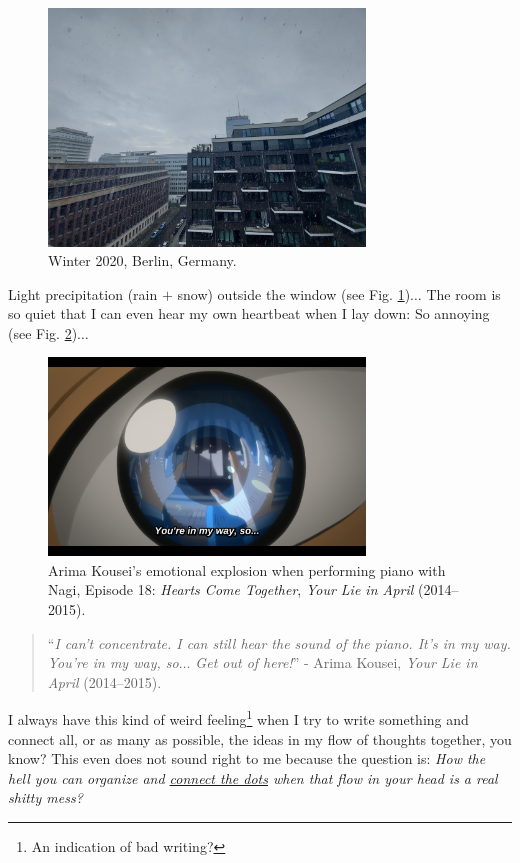 \documentclass[12pt]{article}
\begin{document}
\begin{figure}[H]
	\centering
	\includegraphics[width=0.75\textwidth]{Berlin_winter2020}
	\caption{Winter 2020, Berlin, Germany.}
	\label{fig1}
\end{figure}
Light precipitation (rain $+$ snow) outside the window (see Fig. \ref{fig1})$\ldots$ The room is so quiet that I can even hear my own heartbeat when I lay down: So annoying (see Fig. \ref{fig2})$\ldots$

\begin{figure}[h]
	\centering
	\includegraphics[width=0.75\textwidth]{Arima_Kousei_you_are_in_my_way}
	\caption{Arima Kousei's emotional explosion when performing piano with Nagi, Episode 18: {\it Hearts Come Together}, {\it Your Lie in April} (2014--2015).}
	\label{fig2}
\end{figure}

\begin{quotation}
	``{\it I can't concentrate. I can still hear the sound of the piano. It's in my way. You're in my way, so$\ldots$ Get out of here!}'' - Arima Kousei, {\it Your Lie in April} (2014--2015).
\end{quotation}

I always have this kind of weird feeling\footnote{An indication of bad writing?} when I try to write something and connect all, or as many as possible, the ideas in my flow of thoughts together, you know? This even does not sound right to me because the question is: {\it How the hell you can organize and \href{https://en.wikipedia.org/wiki/Connect_the_dots}{connect the dots} when that flow in your head is a real shitty mess?}
\end{document}

